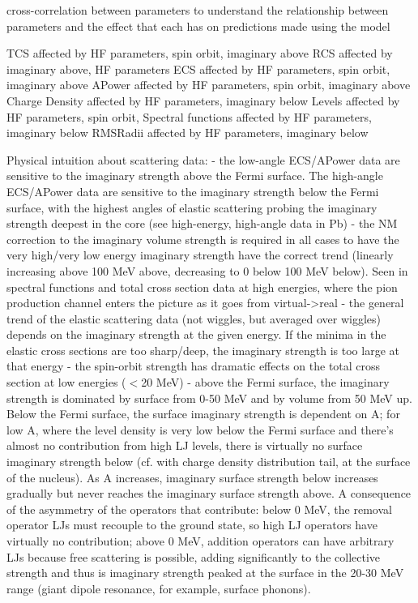 cross-correlation between parameters to understand the relationship between
parameters and the effect that each has on predictions made using the model

TCS affected by HF parameters, spin orbit, imaginary above
RCS affected by imaginary above, HF parameters
ECS affected by HF parameters, spin orbit, imaginary above
APower affected by HF parameters, spin orbit,  imaginary above
Charge Density affected by HF parameters, imaginary below
Levels affected by HF parameters, spin orbit,
Spectral functions affected by HF parameters, imaginary below
RMSRadii affected by HF parameters, imaginary below

Physical intuition about scattering data:
- the low-angle ECS/APower data are sensitive to the imaginary strength above
the Fermi surface. The high-angle ECS/APower data are sensitive to the imaginary
strength below the Fermi surface, with the highest angles of elastic scattering
probing the imaginary strength deepest in the core (see high-energy, high-angle
data in Pb)
- the NM correction to the imaginary volume strength is required in all cases to
have the very high/very low energy imaginary strength have the correct trend
(linearly increasing above 100 MeV above, decreasing to 0 below 100 MeV below).
Seen in spectral functions and total cross section data at high energies, where
the pion production channel enters the picture as it goes from virtual->real
- the general trend of the elastic scattering data (not wiggles, but averaged
over wiggles) depends on the imaginary strength at the given energy. If the
minima in the elastic cross sections are too sharp/deep, the imaginary strength
is too large at that energy
- the spin-orbit strength has dramatic effects on the total cross section at low
energies ($<$20 MeV)
- above the Fermi surface, the imaginary strength is dominated by surface from
0-50 MeV and by volume from 50 MeV up. Below the Fermi surface, the surface
imaginary strength is dependent on A; for low A, where the level density is very
low below the Fermi surface and there's almost no contribution from high LJ
levels, there is virtually no surface imaginary strength below (cf. with charge
density distribution tail, at the surface of the nucleus). As A increases, 
imaginary surface strength below increases gradually but never reaches the
imaginary surface strength above. A consequence of the asymmetry of the
operators that contribute: below 0 MeV, the removal operator LJs
must recouple to the ground state, so high LJ operators have virtually no
contribution; above 0 MeV, addition operators can have arbitrary LJs because
free scattering is possible, adding significantly to the collective strength and
thus is imaginary strength peaked at the surface in the 20-30 MeV range (giant
dipole resonance, for example, surface phonons).

